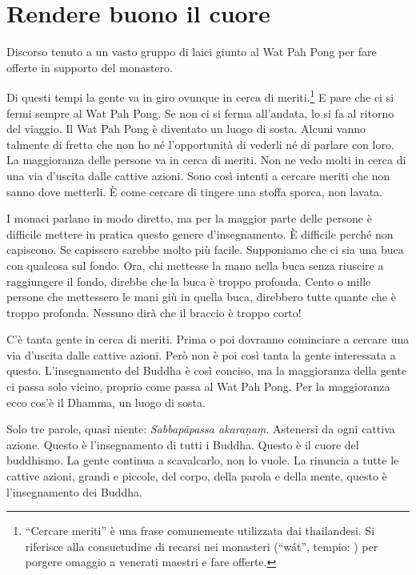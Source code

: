 \chapter{Rendere buono il cuore}

\begin{openingQuote}
  \centering

  Discorso tenuto a un vasto gruppo di laici giunto al Wat Pah Pong per fare
  offerte in supporto del monastero.
\end{openingQuote}

Di questi tempi la gente va in giro ovunque in cerca di
meriti.\footnote{``Cercare meriti'' è una frase comunemente utilizzata
  dai thailandesi. Si riferisce alla consuetudine di recarsi nei
  monasteri (``wát'', tempio: ) per porgere omaggio a venerati
  maestri e fare offerte.} E pare che ci si fermi sempre al Wat Pah
Pong. Se non ci si ferma all'andata, lo si fa al ritorno del viaggio. Il
Wat Pah Pong è diventato un luogo di sosta. Alcuni vanno talmente di
fretta che non ho né l'opportunità di vederli né di parlare con loro. La
maggioranza delle persone va in cerca di meriti. Non ne vedo molti in
cerca di una via d'uscita dalle cattive azioni. Sono così intenti a
cercare meriti che non sanno dove metterli. È come cercare di tingere
una stoffa sporca, non lavata.

I monaci parlano in modo diretto, ma per la maggior parte delle persone
è difficile mettere in pratica questo genere d'insegnamento. È
difficile perché non capiscono. Se capissero sarebbe molto più facile.
Supponiamo che ci sia una buca con qualcosa sul fondo. Ora, chi mettesse
la mano nella buca senza riuscire a raggiungere il fondo, direbbe che la
buca è troppo profonda. Cento o mille persone che mettessero le mani giù
in quella buca, direbbero tutte quante che è troppo profonda. Nessuno
dirà che il braccio è troppo corto!

C'è tanta gente in cerca di meriti. Prima o poi dovranno cominciare a
cercare una via d'uscita dalle cattive azioni. Però non è poi così tanta
la gente interessata a questo. L'insegnamento del Buddha è così conciso,
ma la maggioranza della gente ci passa solo vicino, proprio come passa
al Wat Pah Pong. Per la maggioranza ecco cos'è il Dhamma, un luogo di
sosta.

Solo tre parole, quasi niente: \emph{Sabbapāpassa akaraṇaṃ}. Astenersi
da ogni cattiva azione. Questo è l'insegnamento di tutti i Buddha.
Questo è il cuore del buddhismo. La gente continua a scavalcarlo, non lo
vuole. La rinuncia a tutte le cattive azioni, grandi e piccole, del
corpo, della parola e della mente, questo è l'insegnamento dei Buddha.

